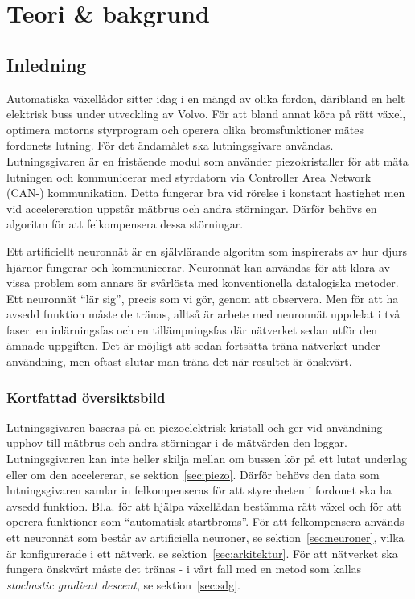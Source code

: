 \section{Teori \& bakgrund}
\subsection{Inledning}
Automatiska växellådor sitter idag i en mängd av olika fordon,
däribland en helt elektrisk buss under utveckling av Volvo.
För att bland annat köra på rätt växel, optimera motorns styrprogram
och operera olika bromsfunktioner %
mätes fordonets lutning.
För det ändamålet ska lutningsgivare användas.
Lutningsgivaren är en fristående modul som använder piezokristaller för att
mäta lutningen och kommunicerar med styrdatorn via
Controller Area Network (CAN-) kommunikation.
Detta fungerar bra vid rörelse i konstant hastighet
men vid accelereration uppstår mätbrus och andra störningar.
Därför behövs en algoritm för att felkompensera dessa störningar.

Ett artificiellt neuronnät är en självlärande algoritm som inspirerats av
hur djurs hjärnor fungerar och kommunicerar.
Neuronnät kan användas för att klara av vissa problem som annars är svårlösta
med konventionella datalogiska metoder.
Ett neuronnät ``lär sig'', precis som vi gör, genom att observera.
Men för att ha avsedd funktion måste de tränas, alltså är arbete med neuronnät
uppdelat i två faser: en inlärningsfas och en tillämpningsfas där nätverket sedan
utför den ämnade uppgiften.
\autocite{copeland16}
Det är möjligt att sedan fortsätta träna nätverket
under användning, men oftast slutar man träna det när resultet är önskvärt.
\autocite{wiki-neuronnat}

\subsubsection{Kortfattad översiktsbild}
Lutningsgivaren baseras på en piezoelektrisk kristall och ger vid användning
upphov till mätbrus och andra störningar i de mätvärden den loggar.
Lutningsgivaren kan inte heller skilja mellan om bussen kör på ett lutat underlag
eller om den accelererar, se sektion~\ref{sec:piezo}.
Därför behövs den data som lutningsgivaren samlar in felkompenseras för att
styrenheten i fordonet ska ha avsedd funktion. Bl.a. för att hjälpa växellådan
bestämma rätt växel och för att operera funktioner som ``automatisk startbroms''.
För att felkompensera används ett neuronnät som består av artificiella
neuroner, se sektion~\ref{sec:neuroner}, vilka är konfigurerade i ett nätverk,
se sektion~\ref{sec:arkitektur}. För att nätverket ska fungera önskvärt måste
det tränas - i vårt fall med en metod som kallas \emph{stochastic gradient descent},
se sektion~\ref{sec:sdg}.

